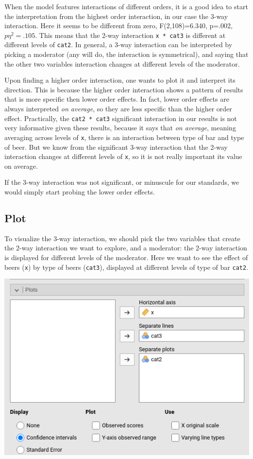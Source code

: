 \documentclass[
]{book}
\begin{document}
When the model features interactions of different orders, it is a good idea to start the interpretation from the highest order interaction, in our case the 3-way interaction. Here it seems to be different from zero, F(2,108)=6.340, p=.002, \(p\eta^2=.105\).
This means that the 2-way interaction \texttt{x\ *\ cat3} is different at different levels of \texttt{cat2}. In general, a 3-way interaction can be interpreted by picking a moderator (any will do, the interaction is symmetrical), and saying that the other two variables interaction changes at different levels of the moderator.

Upon finding a higher order interaction, one wants to plot it and interpret its direction. This is because the higher order interaction shows a pattern of results that is more specific then lower order effects. In fact, lower order effects are always interpreted \emph{on average}, so they are less specific than the higher order effect. Practically, the \texttt{cat2\ *\ cat3} significant interaction in our results is not very informative given these results, because it says that \emph{on average}, meaning averaging across levels of \texttt{x}, there is an interaction between type of bar and type of beer. But we know from the significant 3-way interaction that the 2-way interaction changes at different levels of \texttt{x}, so it is not really important its value on average.

If the 3-way interaction was not significant, or minuscule for our standards, we would simply start probing the lower order effects.

\hypertarget{plot}{%
\subsection{Plot}\label{plot}}

To visualize the 3-way interaction, we should pick the two variables that create the 2-way interaction we want to explore, and a moderator: the 2-way interaction is displayed for different levels of the moderator. Here we want to see the effect of beers (\texttt{x}) by type of beers (\texttt{cat3}), displayed at different levels of type of bar \texttt{cat2}.

\includegraphics[width=7.83in]{bookletpics/2_ancova_input4}
\end{document}
